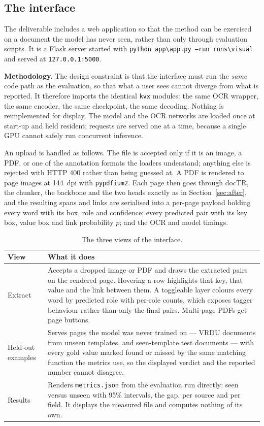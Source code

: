 \documentclass[11pt,a4paper]{article}
\newcommand{\code}[1]{\texttt{\small #1}}
\begin{document}
\subsection{The interface}
\label{sec:interface}

The deliverable includes a web application so that the method can be exercised on a document the
model has never seen, rather than only through evaluation scripts. It is a Flask server started
with \code{python app\textbackslash app.py --run runs\textbackslash visual} and served at
\code{127.0.0.1:5000}.

\textbf{Methodology.} The design constraint is that the interface must run the \emph{same} code
path as the evaluation, so that what a user sees cannot diverge from what is reported. It
therefore imports the identical \code{kvx} modules: the same OCR wrapper, the same encoder, the
same checkpoint, the same decoding. Nothing is reimplemented for display. The model and the OCR
networks are loaded once at start-up and held resident; requests are served one at a time, because
a single GPU cannot safely run concurrent inference.

An upload is handled as follows. The file is accepted only if it is an image, a PDF, or one of the
annotation formats the loaders understand; anything else is rejected with HTTP 400 rather than
being guessed at. A PDF is rendered to page images at 144~dpi with \code{pypdfium2}. Each page
then goes through docTR, the chunker, the backbone and the two heads exactly as in
Section~\ref{sec:after}, and the resulting spans and links are serialised into a per-page payload
holding every word with its box, role and confidence; every predicted pair with its key box, value
box and link probability $p$; and the OCR and model timings.

\begin{table}[htbp]
\centering\small
\begin{tabular}{@{}p{3.1cm}p{10.3cm}@{}}
\toprule
\textbf{View} & \textbf{What it does} \\
\midrule
Extract & Accepts a dropped image or PDF and draws the extracted pairs on the rendered page.
Hovering a row highlights that key, that value and the link between them. A toggleable layer
colours every word by predicted role with per-role counts, which exposes tagger behaviour rather
than only the final pairs. Multi-page PDFs get page buttons. \\
Held-out examples & Serves pages the model was never trained on --- VRDU documents from unseen
templates, and seen-template test documents --- with every gold value marked found or missed by
the same matching function the metrics use, so the displayed verdict and the reported number
cannot disagree. \\
Results & Renders \code{metrics.json} from the evaluation run directly: seen versus unseen with
95\% intervals, the gap, per source and per field. It displays the measured file and computes
nothing of its own. \\
\bottomrule
\end{tabular}
\caption{The three views of the interface.}
\label{tab:interface}
\end{table}
\end{document}
